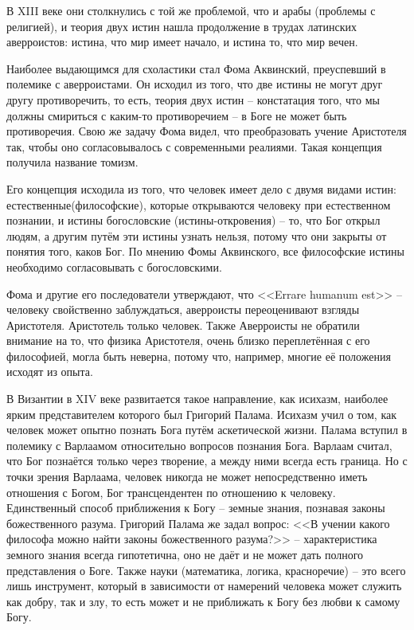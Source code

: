 \documentclass[a4paper, 12pt]{book} %
\begin{document}
В XIII веке они столкнулись с той же проблемой, что и арабы (проблемы с религией), и теория двух истин нашла продолжение в трудах латинских аверроистов: истина, что мир имеет начало, и истина то, что мир вечен.

Наиболее выдающимся для схоластики стал Фома Аквинский, преуспевший в полемике с аверроистами.	Он исходил из того, что две истины не могут друг другу противоречить, то есть, теория двух истин -- констатация того, что мы должны смириться с каким-то противоречием -- в Боге не может быть противоречия. Свою же задачу Фома видел, что преобразовать учение Аристотеля так, чтобы оно согласовывалось с современными реалиями. Такая концепция получила название томизм.

Его концепция исходила из того, что человек имеет дело с двумя видами истин: естественные(философские), которые открываются человеку при естественном познании, и истины богословские (истины-откровения) -- то, что Бог открыл людям, а другим путём эти истины узнать нельзя, потому что они закрыты от понятия того, каков Бог. По мнению Фомы Аквинского, все философские истины необходимо согласовывать с богословскими. 

Фома и другие его последователи утверждают, что <<Errare humanum est>> -- человеку свойственно заблуждаться, аверроисты переоценивают взгляды Аристотеля. Аристотель только человек. Также Аверроисты не обратили внимание на то, что физика Аристотеля, очень близко переплетённая с его философией, могла быть неверна, потому что, например, многие её положения исходят из опыта.

В Византии в XIV веке развитается такое направление, как исихазм, наиболее ярким представителем которого был Григорий Палама. Исихазм учил о том, как человек может опытно познать Бога путём аскетической жизни. Палама вступил в полемику с Варлаамом относительно вопросов познания Бога. Варлаам считал, что Бог познаётся только через творение, а между ними всегда есть граница. Но с точки зрения Варлаама, человек никогда не может непосредственно иметь отношения с Богом, Бог трансцендентен по отношению к человеку. Единственный способ приближения к Богу -- земные знания, познавая законы божественного разума. Григорий Палама же задал вопрос: <<В учении какого философа можно найти законы божественного разума?>> -- характеристика земного знания всегда гипотетична, оно не даёт и не может дать полного представления о Боге. Также  науки (математика, логика, красноречие) -- это всего лишь инструмент, который в зависимости от намерений человека может служить как добру, так и злу, то есть может и не приближать к Богу без любви к самому Богу.
\end{document}
